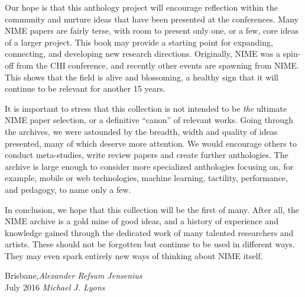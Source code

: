 Our hope is that this anthology project will encourage reflection within the community and nurture ideas that have been presented at the conferences. Many NIME papers are fairly terse, with room to present only one, or a few, core ideas of a larger project. This book may provide a starting point for expanding, connecting, and developing new research directions. Originally, NIME was a spin-off from the CHI conference, and recently other events are spawning from NIME. This shows that the field is alive and blossoming, a healthy sign that it will continue to be relevant  for another 15 years. 

It is important to stress that this collection is not intended to be \emph{the} ultimate NIME paper selection, or a definitive ``canon'' of relevant works. Going through the archives, we were astounded by the breadth, width and quality of ideas presented, many of which deserve more attention. We would encourage others to conduct meta-studies, write review papers and create further anthologies. The archive is large enough to consider more specialized anthologies focusing on, for example, mobile or web technologies, machine learning, tactility, performance, and pedagogy, to name only a few. 

In conclusion, we hope that this collection will be the first of many. After all, the NIME archive is a gold mine of good ideas, and a history of experience and knowledge gained through the dedicated work of many talented researchers and artists. These should not be forgotten but continue to be used in different ways. They may even spark entirely new ways of thinking about NIME itself.


\vspace{\baselineskip}
\begin{flushright}\noindent
Brisbane,\hfill {\it Alexander Refsum Jensenius}\\
July 2016 \hfill {\it Michael J. Lyons}\\
\end{flushright}


